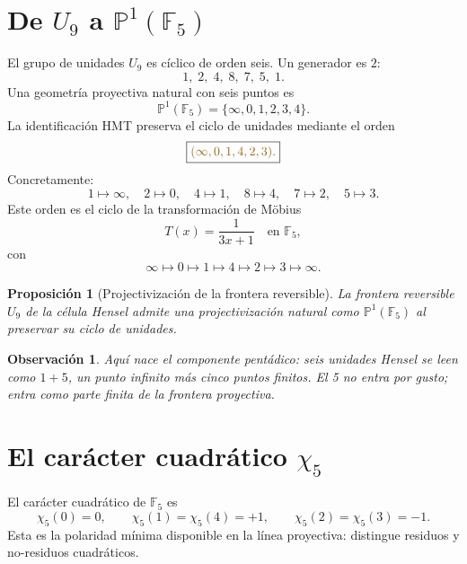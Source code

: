 \documentclass[11pt,a4paper]{article}
\newcommand{\gold}[1]{\textcolor{HMTgold}{#1}}
\newcommand{\F}{\mathbb F}
\newcommand{\Pone}{\mathbb P^1}
\newtheorem{proposicion}{Proposición}
\newtheorem{observacion}{Observación}
\begin{document}
\section{De \(U_9\) a \(\Pone(\F_5)\)}
El grupo de unidades \(U_9\) es cíclico de orden seis. Un generador es \(2\):
\[
1,\;2,\;4,\;8,\;7,\;5,\;1.
\]
Una geometría proyectiva natural con seis puntos es
\[
\Pone(\F_5)=\{\infty,0,1,2,3,4\}.
\]
La identificación HMT preserva el ciclo de unidades mediante el orden
\[
\boxed{\gold{(\infty,0,1,4,2,3).}}
\]
Concretamente:
\[
1\mapsto\infty,
\quad
2\mapsto0,
\quad
4\mapsto1,
\quad
8\mapsto4,
\quad
7\mapsto2,
\quad
5\mapsto3.
\]
Este orden es el ciclo de la transformación de Möbius
\[
T(x)=\frac{1}{3x+1}\quad \text{en }\F_5,
\]
con
\[
\infty\mapsto0\mapsto1\mapsto4\mapsto2\mapsto3\mapsto\infty.
\]

\begin{proposicion}[Projectivización de la frontera reversible]
La frontera reversible \(U_9\) de la célula Hensel admite una projectivización natural como \(\Pone(\F_5)\) al preservar su ciclo de unidades.
\end{proposicion}

\begin{observacion}
Aquí nace el componente pentádico: seis unidades Hensel se leen como \(1+5\), un punto infinito más cinco puntos finitos. El 5 no entra por gusto; entra como parte finita de la frontera proyectiva.
\end{observacion}

\section{El carácter cuadrático \(\chi_5\)}
El carácter cuadrático de \(\F_5\) es
\[
\chi_5(0)=0,
\qquad
\chi_5(1)=\chi_5(4)=+1,
\qquad
\chi_5(2)=\chi_5(3)=-1.
\]
Esta es la polaridad mínima disponible en la línea proyectiva: distingue residuos y no-residuos cuadráticos.
\end{document}
